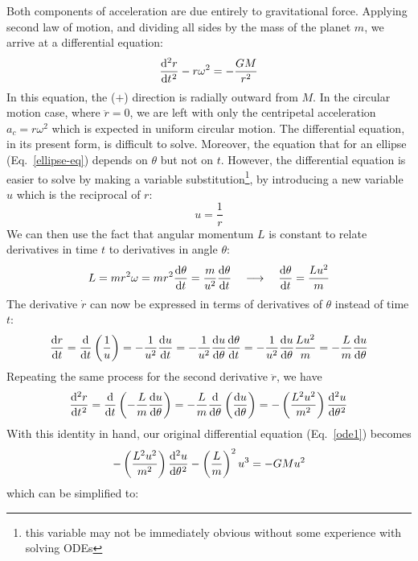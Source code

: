 \documentclass{../../oss-handout}
\begin{document}
Both components of acceleration are due entirely to gravitational force.
Applying second law of motion, and dividing all sides by the mass of the planet
$m$, we arrive at a differential equation:
\begin{equation}
  \diff[2]rt-r\omega^2=-\frac{GM}{r^2}
  \label{ode1}
\end{equation}
In this equation, the ($+$) direction is radially outward from $M$. In the
circular motion case, where $\ddot r=0$, we are left with only the centripetal
acceleration $a_c=r\omega^2$ which is expected in uniform circular motion. The
differential equation, in its present form, is difficult to solve. Moreover,
the equation that for an ellipse (Eq.~\ref{ellipse-eq}) depends on $\theta$ but
not on $t$. However, the differential equation is easier to solve by making a
variable substitution\footnote{this variable may not be immediately obvious
  without some experience with solving ODEs}, by introducing a new variable $u$
which is the reciprocal of $r$:
\begin{equation}
  u=\frac1r
\end{equation}
We can then use the fact that angular momentum $L$ is constant to relate
derivatives in time $t$ to derivatives in angle $\theta$:
\begin{equation}
  L=mr^2\omega=mr^2\diff{\theta}t=\frac m{u^2}\diff{\theta}t
  \quad\longrightarrow\quad
  \diff{\theta}t=\frac{Lu^2}m
\end{equation}
The derivative $\dot r$ can now be expressed in terms of derivatives of
$\theta$ instead of time $t$:
\begin{equation}
  \diff rt =\diff*{\left(\frac1u\right)}t
  =-\frac1{u^2}\diff ut=-\frac1{u^2}\diff u\theta\diff{\theta}t
  = -\frac1{u^2}\diff u\theta \frac{Lu^2}m
  = -\frac Lm\diff u\theta
\end{equation}
Repeating the same process for the second derivative $\ddot r$, we have
\begin{equation}
  \diff[2] rt = \diff*{\left(-\frac Lm\diff u\theta\right)}t
  = -\frac Lm\diff*{\left(\diff u\theta\right)}\theta \\
  = -\left(\frac{L^2u^2}{m^2}\right)\diff[2]u\theta
\end{equation}
With this identity in hand, our original differential equation
(Eq.~\ref{ode1}) becomes
\begin{equation}
  -\left(\frac{L^2u^2}{m^2}\right)\diff[2]u\theta-\left(\frac Lm\right)^2u^3
  = -GMu^2
\end{equation}
which can be simplified to:
\end{document}
